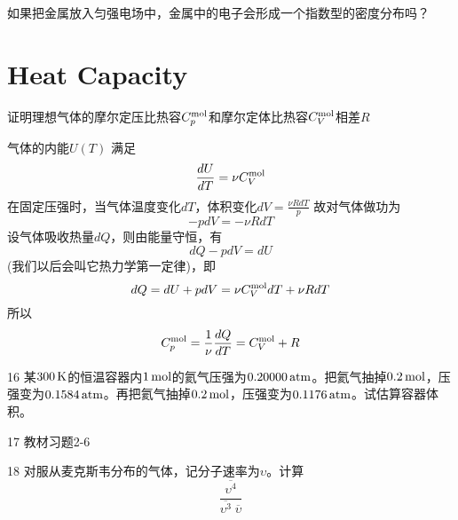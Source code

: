 \documentclass[CJK]{beamer}
\begin{document}
\begin{frame}
\bch
{}
如果把金属放入匀强电场中，金属中的电子会形成一个指数型的密度分布吗？
\ech
\end{frame}


\section{Heat Capacity}


\begin{frame}
\bch
{\blue 证明理想气体的摩尔定压比热容$C_p^{\rm mol}$和摩尔定体比热容$C_V^{\rm mol}$相差$R$}

\skipline
{\scriptsize
气体的内能$U(T)$ 满足
$$\frac{dU}{dT} = \nu C_V^{\rm mol}$$
在固定压强时，当气体温度变化$dT$，体积变化$dV = \frac{ \nu R dT}{p}$
故对气体做功为
$$-p dV = - \nu R dT$$
设气体吸收热量$dQ$，则由能量守恒，有
$$dQ - pdV = dU$$
(我们以后会叫它热力学第一定律)，即
$$dQ = dU + pdV =  \nu C_V^{\rm mol}dT + \nu RdT$$
所以
$$C_p^{\rm mol} = \frac{1}{\nu} \frac{dQ}{dT} = C_V^{\rm mol} + R$$

}
\ech
\end{frame}

\begin{frame}
\bch
{\small
\bitem
\item[16]{某$300\,\mathrm{K}$的恒温容器内$1\,\mathrm{mol}$的氦气压强为$0.20000\,\mathrm{atm}$。把氦气抽掉$0.2\,\mathrm{mol}$，压强变为$0.1584\,\mathrm{atm}$。再把氦气抽掉$0.2\,\mathrm{mol}$，压强变为$0.1176\,\mathrm{atm}$。试估算容器体积。}
\item[17]{教材习题2-6}
\item[18]{对服从麦克斯韦分布的气体，记分子速率为$\upsilon$。计算$$\frac{\overline{\upsilon^4}}{\overline{\upsilon^3}\;\overline{\upsilon}}$$}
\eitem
}
\ech
\end{frame}
\end{document}
